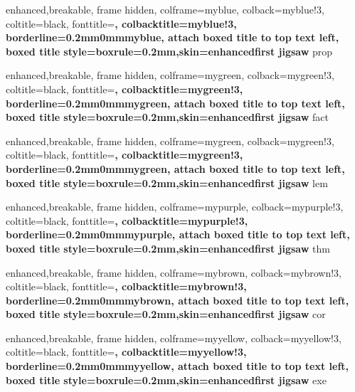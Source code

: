 {
	enhanced,breakable,
	frame hidden,
	colframe=myblue,
	colback=myblue!3,
	coltitle=black,
	fonttitle=\bfseries,
	colbacktitle=myblue!3,
	borderline={0.2mm}{0mm}{myblue},
	attach boxed title to top text left,
	boxed title style={boxrule=0.2mm,skin=enhancedfirst jigsaw}
}
{prop}

{
	enhanced,breakable,
	frame hidden,
	colframe=mygreen,
	colback=mygreen!3,
	coltitle=black,
	fonttitle=\bfseries,
	colbacktitle=mygreen!3,
	borderline={0.2mm}{0mm}{mygreen},
	attach boxed title to top text left,
	boxed title style={boxrule=0.2mm,skin=enhancedfirst jigsaw}
}
{fact}

{
	enhanced,breakable,
	frame hidden,
	colframe=mygreen,
	colback=mygreen!3,
	coltitle=black,
	fonttitle=\bfseries,
	colbacktitle=mygreen!3,
	borderline={0.2mm}{0mm}{mygreen},
	attach boxed title to top text left,
	boxed title style={boxrule=0.2mm,skin=enhancedfirst jigsaw}
}
{lem}

{
	enhanced,breakable,
	frame hidden,
	colframe=mypurple,
	colback=mypurple!3,
	coltitle=black,
	fonttitle=\bfseries,
	colbacktitle=mypurple!3,
	borderline={0.2mm}{0mm}{mypurple},
	attach boxed title to top text left,
	boxed title style={boxrule=0.2mm,skin=enhancedfirst jigsaw}
}
{thm}

{
	enhanced,breakable,
	frame hidden,
	colframe=mybrown,
	colback=mybrown!3,
	coltitle=black,
	fonttitle=\bfseries,
	colbacktitle=mybrown!3,
	borderline={0.2mm}{0mm}{mybrown},
	attach boxed title to top text left,
	boxed title style={boxrule=0.2mm,skin=enhancedfirst jigsaw}
}
{cor}

{
	enhanced,breakable,
	frame hidden,
	colframe=myyellow,
	colback=myyellow!3,
	coltitle=black,
	fonttitle=\bfseries,
	colbacktitle=myyellow!3,
	borderline={0.2mm}{0mm}{myyellow},
	attach boxed title to top text left,
	boxed title style={boxrule=0.2mm,skin=enhancedfirst jigsaw}
}
{exe}

\newenvironment{proofidea}{\renewcommand{\proofname}{Proof Idea}\proof}{\endproof}


\def\R{\mathbb R}
\def\Cb{\mathbb C}
\def\N{\mathbb N}
\def\Z{\mathbb Z}
\def\Q{\mathbb Q}
\def\E{\mathbb E}

